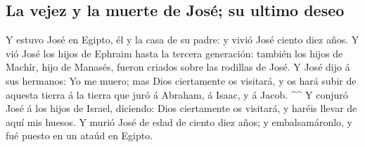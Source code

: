 \hypertarget{la-vejez-y-la-muerte-de-josuxe9-su-ultimo-deseo}{%
\subsection{La vejez y la muerte de José; su ultimo
deseo}\label{la-vejez-y-la-muerte-de-josuxe9-su-ultimo-deseo}}

 Y estuvo José en Egipto, él y la casa de su padre: y vivió
José ciento diez años.  Y vió José los hijos de Ephraim
hasta la tercera generación: también los hijos de Machîr, hijo de
Manasés, fueron criados sobre las rodillas de José.  Y José
dijo á sus hermanos: Yo me muero; mas Dios ciertamente os visitará, y os
hará subir de aquesta tierra á la tierra que juró á Abraham, á Isaac, y
á Jacob. \^{}\^{}  Y conjuró José á los hijos de Israel,
diciendo: Dios ciertamente os visitará, y haréis llevar de aquí mis
huesos.  Y murió José de edad de ciento diez años; y
embalsamáronlo, y fué puesto en un ataúd en Egipto.
